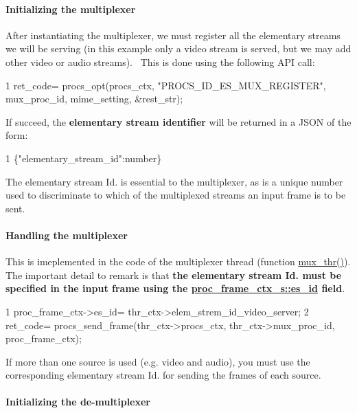\paragraph*{Initializing the multiplexer}

After instantiating the multiplexer, we must register all the elementary streams we will be serving (in this example only a video stream is served, but we may add other video or audio streams).~\newline
 This is done using the following A\+PI call\+: 
\begin{DoxyCode}
1 ret\_code= procs\_opt(procs\_ctx, "PROCS\_ID\_ES\_MUX\_REGISTER", mux\_proc\_id, mime\_setting, &rest\_str);
\end{DoxyCode}
 If succeed, the {\bfseries elementary stream identifier} will be returned in a J\+S\+ON of the form\+: 
\begin{DoxyCode}
1 \{"elementary\_stream\_id":number\}
\end{DoxyCode}
 The elementary stream Id. is essential to the multiplexer, as is a unique number used to discriminate to which of the multiplexed streams an input frame is to be sent.

\paragraph*{Handling the multiplexer}

This is imeplemented in the code of the multiplexer thread (function \textquotesingle{}\hyperlink{codecs__muxers__loopback_8c_a494104de8b24b4783b3e8de4609c761e}{mux\+\_\+thr()}\textquotesingle{}). The important detail to remark is that {\bfseries the elementary stream Id. must be specified in the input frame using the \hyperlink{structproc__frame__ctx__s_a457dcb8ae6440506054f07483f48be1f}{proc\+\_\+frame\+\_\+ctx\+\_\+s\+::es\+\_\+id} field}. 
\begin{DoxyCode}
1 proc\_frame\_ctx->es\_id= thr\_ctx->elem\_strem\_id\_video\_server;
2 ret\_code= procs\_send\_frame(thr\_ctx->procs\_ctx, thr\_ctx->mux\_proc\_id, proc\_frame\_ctx);
\end{DoxyCode}
 If more than one source is used (e.\+g. video and audio), you must use the corresponding elementary stream Id. for sending the frames of each source.

\paragraph*{Initializing the de-\/multiplexer}

